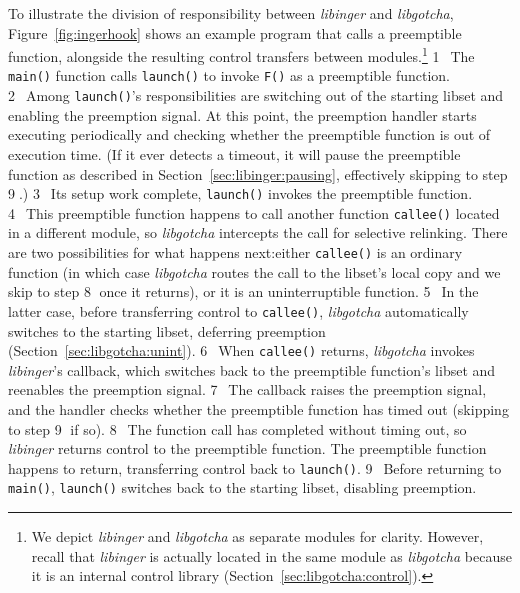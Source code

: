 To illustrate the division of responsibility between \textit{libinger} and
\textit{libgotcha}, Figure~\ref{fig:ingerhook} shows an example program that calls a
preemptible function, alongside the resulting control transfers between
modules.\footnote{We depict \textit{libinger} and \textit{libgotcha} as separate
modules for clarity.  However, recall that \textit{libinger} is actually located in
the same module as \textit{libgotcha} because it is an internal control library
(Section~\ref{sec:libgotcha:control}).} \textcircled{1}~The \texttt{main()} function
calls \texttt{launch()} to invoke \texttt{F()} as a preemptible function.
\textcircled{2}~Among \texttt{launch()}'s responsibilities are switching out of the
starting libset and enabling the preemption signal.  At this point, the preemption
handler starts executing periodically and checking whether the preemptible function
is out of execution time.  (If it ever detects a timeout, it will pause the
preemptible function as described in Section~\ref{sec:libinger:pausing}, effectively
skipping to step \textcircled{9}.)  \textcircled{3}~Its setup work complete,
\texttt{launch()} invokes the preemptible function.  \textcircled{4}~This preemptible
function happens to call another function \texttt{callee()} located in a different
module, so \textit{libgotcha} intercepts the call for selective relinking.  There are
two possibilities for what happens next:\@ either \texttt{callee()} is an ordinary
function (in which case \textit{libgotcha} routes the call to the libset's local copy
and we skip to step \textcircled{8} once it returns), or it is an uninterruptible
function.  \textcircled{5}~In the latter case, before transferring control to
\texttt{callee()}, \textit{libgotcha} automatically switches to the starting libset,
deferring preemption (Section~\ref{sec:libgotcha:unint}).  \textcircled{6}~When
\texttt{callee()} returns,
\textit{libgotcha} invokes \textit{libinger}'s callback, which switches back to the
preemptible function's libset and reenables the preemption signal.
\textcircled{7}~The callback raises the preemption signal, and the handler checks
whether the preemptible function has timed out (skipping to step \textcircled{9} if
so).  \textcircled{8}~The function call has completed without timing out, so
\textit{libinger} returns control to the preemptible function.  The preemptible
function happens to return, transferring control back to \texttt{launch()}.
\textcircled{9}~Before returning to \texttt{main()}, \texttt{launch()} switches back
to the starting libset, disabling preemption.

